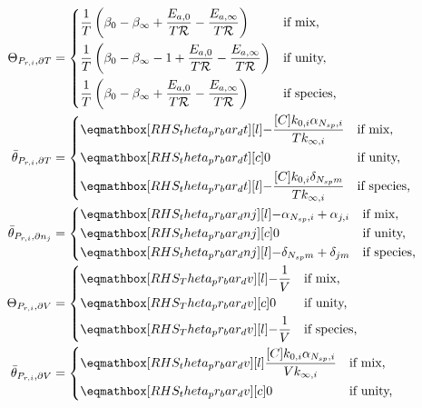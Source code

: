 \documentclass[12pt]{article}
\newcommand{\ns}{N_{sp}}
\newcommand{\Ru}{\mathcal{R}}
\begin{document}
\begin{align}
 \label{e:dpr_theta_dt}
 \Theta_{P_{r,i}, \partial T} &=
 \begin{dcases}
  \frac{1}{T} \left(\beta_{0} - \beta_{\infty} + \frac{E_{a, 0}}{T \Ru} - \frac{E_{a, \infty}}{T \Ru}\right) & \text{if mix,} \\
  \frac{1}{T} \left(\beta_{0} - \beta_{\infty} - 1 + \frac{E_{a, 0}}{T \Ru} - \frac{E_{a, \infty}}{T \Ru}\right) & \text{if unity,} \\
  \frac{1}{T} \left(\beta_{0} - \beta_{\infty} + \frac{E_{a, 0}}{T \Ru} - \frac{E_{a, \infty}}{T \Ru}\right) & \text{if species,}
 \end{dcases} \\
 \label{e:dpr_theta_bar_dt}
 \bar{\theta}_{P_{r, i}, \partial T} &=
 \begin{dcases}
  \rhs{theta_pr_bar_dt}{- \frac{[C] k_{0, i} \alpha_{\ns,i}}{T k_{\infty, i}}} & \text{if mix,} \\
  \rhs{theta_pr_bar_dt}{0}[c] & \text{if unity,} \\
  \rhs{theta_pr_bar_dt}{- \frac{[C] k_{0, i} \delta_{\ns m}}{T k_{\infty, i}}} & \text{if species,}
 \end{dcases} \\
 \label{e:dpr_theta_bar_dnj}
 \bar{\theta}_{P_{r, i}, \partial n_j} &=
 \begin{dcases}
  \rhs{theta_pr_bar_dnj}{- \alpha_{\ns,i} + \alpha_{j,i}} & \text{if mix,} \\
  \rhs{theta_pr_bar_dnj}{0}[c] & \text{if unity,}  \\
  \rhs{theta_pr_bar_dnj}{- \delta_{\ns m} + \delta_{j m}} & \text{if species,}
 \end{dcases} \\
 \label{e:dpr_theta_dv}
 \Theta_{P_{r,i}, \partial V} &=
 \begin{dcases}
  \rhs{Theta_pr_bar_dv}{- \frac{1}{V}} & \text{if mix,} \\
  \rhs{Theta_pr_bar_dv}{0}[c] & \text{if unity,}  \\
  \rhs{Theta_pr_bar_dv}{- \frac{1}{V}} & \text{if species,}
 \end{dcases} \\
 \label{e:dpr_theta_bar_dv}
 \bar{\theta}_{P_{r, i}, \partial V} &=
 \begin{dcases}
  \rhs{theta_pr_bar_dv}{\frac{[C] k_{0, i} \alpha_{\ns,i}}{V k_{\infty, i}}} & \text{if mix,} \\
  \rhs{theta_pr_bar_dv}{0}[c] & \text{if unity,}  \\

\end{dcases}
\end{align}
\end{document}
